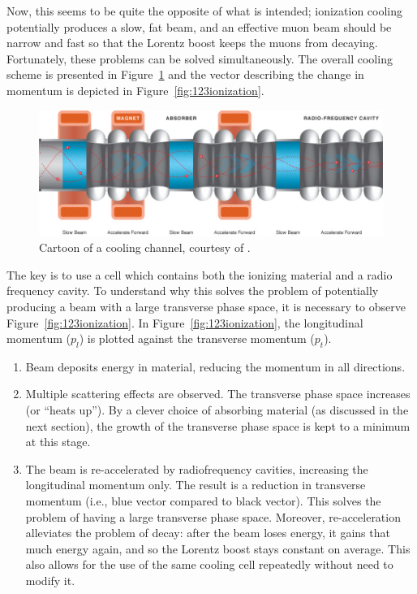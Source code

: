 Now, this seems to be quite the opposite of what is intended; ionization cooling potentially produces a slow, fat beam, and an effective muon beam should be narrow and fast so that the Lorentz boost keeps the muons from decaying. Fortunately, these problems can be solved simultaneously. The overall cooling scheme is presented in  Figure~\ref{fig:coolingchannel} and the vector describing the change in momentum is depicted in Figure~\ref{fig:123ionization}.
\begin{figure}
  \begin{center} 
    \includegraphics[width=\textwidth]{Figures/coolingchannel} 
  \caption[Cartoon of a cooling channel.]{Cartoon of a cooling channel, courtesy of \cite{map}.}
  \label{fig:coolingchannel}
 \end{center}
\end{figure}

The key is to use a cell which contains both the ionizing material and a radio frequency cavity. To understand why this solves the problem of potentially producing a beam with a large transverse phase space, it is necessary to observe Figure~\ref{fig:123ionization}. In Figure~\ref{fig:123ionization}, the longitudinal momentum ($p_l$) is plotted against the transverse momentum ($p_t$). 
   \begin{enumerate} 
  \item{Beam deposits energy in material, reducing the momentum in all directions.}
  \item{Multiple scattering effects are observed. The transverse phase space increases (or ``heats up''). By a clever choice of absorbing material (as discussed in the next section), the growth of the transverse phase space is kept to a minimum at this stage.}
  \item{The beam is re-accelerated by radiofrequency cavities, increasing the longitudinal momentum only. The result is a reduction in transverse momentum (i.e., blue vector compared to black vector). This solves the problem of having a large transverse phase space. Moreover, re-acceleration alleviates the problem of decay: after the beam loses energy, it gains that much energy again, and so the Lorentz boost stays constant on average. This also allows for the use of the same cooling cell repeatedly without need to modify it.}
\end{enumerate}

